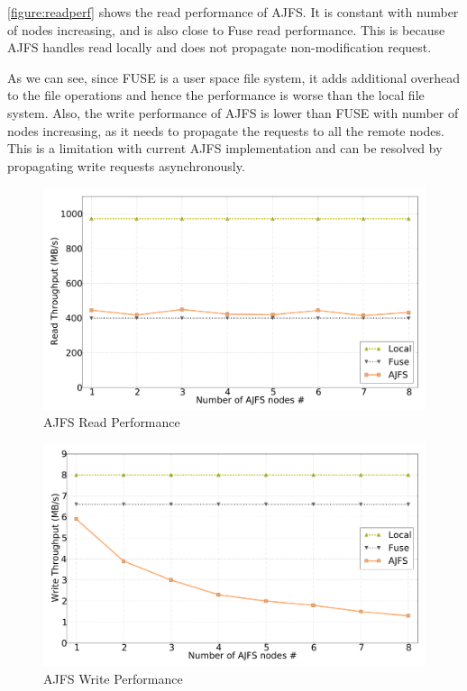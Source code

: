 \ref{figure:readperf} shows the read performance of AJFS. It is constant with number of nodes increasing, and is also close to Fuse read performance.
This is because AJFS handles read locally and does not propagate non-modification request.

As we can see, since FUSE is a user space file system, it adds additional
 overhead to the file operations and hence the performance is worse than the local file system.
Also, the write performance of AJFS is lower than FUSE with number of nodes increasing, as it needs to propagate the requests to all the remote nodes.
 This is a limitation with current AJFS implementation and can be resolved by propagating write requests asynchronously.

\begin{figure}[Ht]
\includegraphics[width=\linewidth]{readperf.pdf}
\caption{AJFS Read Performance}
\label{fig:readperf}
\vspace{-5mm}
\end{figure}

\begin{figure}[Ht]
\includegraphics[width=\linewidth]{writeperf.pdf}
\caption{AJFS Write Performance}
\label{fig:writeperf}
\vspace{-5mm}
\end{figure}

